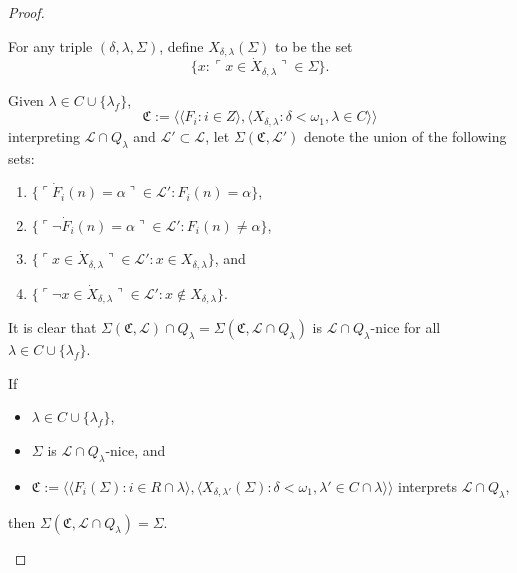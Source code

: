 \documentclass[12pt]{article}
\numberwithin{equation}{section}
\begin{document}
\begin{proof}
\begin{defi}
For any triple $(\delta, \lambda, \Sigma)$, define $X_{\delta, \lambda}(\Sigma)$ to be the set $$\{x : \ulcorner x \in \dot{X}_{\delta, \lambda} \urcorner \in \Sigma\}.$$
\end{defi}

\begin{defi}\label{def415}
Given $\lambda \in C \cup \{\lambda_f\}$, $$\mathfrak{C} := \langle \langle F_i : i \in Z \rangle, \langle X_{\delta, \lambda} : \delta < \omega_1, \lambda \in C \rangle \rangle$$
interpreting $\mathcal{L} \cap Q_{\lambda}$ and $\mathcal{L}' \subset \mathcal{L}$, let $\Sigma(\mathfrak{C}, \mathcal{L}')$ denote the union of the following sets:
\begin{enumerate}[label=(\alph*)]
    \item $\{\ulcorner \dot{F}_i (n) = \alpha \urcorner \in \mathcal{L}' : F_i (n) = \alpha\}$,
    \item $\{\ulcorner \neg \dot{F}_i (n) = \alpha \urcorner \in \mathcal{L}' : F_i (n) \neq \alpha\}$,
    \item $\{\ulcorner x \in \dot{X}_{\delta, \lambda} \urcorner \in \mathcal{L}' : x \in X_{\delta, \lambda}\}$, and
    \item $\{\ulcorner \neg x \in \dot{X}_{\delta, \lambda} \urcorner \in \mathcal{L}' : x \not\in X_{\delta, \lambda}\}$.
\end{enumerate}
It is clear that $\Sigma(\mathfrak{C}, \mathcal{L}) \cap Q_{\lambda} = \Sigma(\mathfrak{C}, \mathcal{L} \cap Q_{\lambda})$ is $\mathcal{L} \cap Q_{\lambda}$-nice for all $\lambda \in C \cup \{\lambda_f\}$.
\end{defi}

\begin{rem}\label{rem416}
If 
\begin{itemize}
    \item $\lambda \in C \cup \{\lambda_f\}$, 
    \item $\Sigma$ is $\mathcal{L} \cap Q_{\lambda}$-nice, and
    \item $\mathfrak{C} := \langle \langle F_i(\Sigma) : i \in R \cap \lambda \rangle, \langle X_{\delta, \lambda'}(\Sigma) : \delta < \omega_1, \lambda' \in C \cap \lambda \rangle \rangle$ interprets $\mathcal{L} \cap Q_{\lambda}$,
\end{itemize}
then $\Sigma(\mathfrak{C}, \mathcal{L} \cap Q_{\lambda}) = \Sigma$.
\end{rem}


\end{proof}
\end{document}
